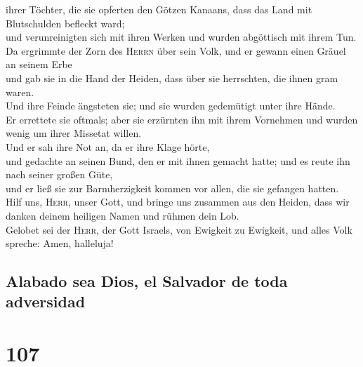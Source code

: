 ihrer Töchter, die sie opferten den Götzen Kanaans, dass das Land mit
Blutschulden befleckt ward;\\
 und verunreinigten sich mit ihren Werken und wurden
abgöttisch mit ihrem Tun.\\
 Da ergrimmte der Zorn des \textsc{Herrn} über sein Volk,
und er gewann einen Gräuel an seinem Erbe\\
 und gab sie in die Hand der Heiden, dass über sie
herrschten, die ihnen gram waren.\\
 Und ihre Feinde ängsteten sie; und sie wurden gedemütigt
unter ihre Hände.\\
 Er errettete sie oftmals; aber sie erzürnten ihn mit
ihrem Vornehmen und wurden wenig um ihrer Missetat willen.\\
 Und er sah ihre Not an, da er ihre Klage hörte,\\
 und gedachte an seinen Bund, den er mit ihnen gemacht
hatte; und es reute ihn nach seiner großen Güte,\\
 und er ließ sie zur Barmherzigkeit kommen vor allen, die
sie gefangen hatten.\\
 Hilf uns, \textsc{Herr}, unser Gott, und bringe uns
zusammen aus den Heiden, dass wir danken deinem heiligen Namen und
rühmen dein Lob.\\
 Gelobet sei der \textsc{Herr}, der Gott Israels, von
Ewigkeit zu Ewigkeit, und alles Volk spreche: Amen, halleluja!

\hypertarget{alabado-sea-dios-el-salvador-de-toda-adversidad}{%
\subsection{Alabado sea Dios, el Salvador de toda
adversidad}\label{alabado-sea-dios-el-salvador-de-toda-adversidad}}

\hypertarget{section-106}{%
\section{107}\label{section-106}}

